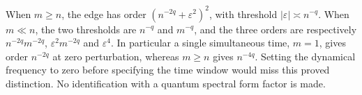 When $m\ge n$, the edge has order $(n^{-2q}+\varepsilon^2)^2$, with
threshold $|\varepsilon|\asymp n^{-q}$. When $m\ll n$, the two thresholds
are $n^{-q}$ and $m^{-q}$, and the three orders are respectively
$n^{-2q}m^{-2q}$, $\varepsilon^2m^{-2q}$ and $\varepsilon^4$.
In particular a single simultaneous time, $m=1$, gives order $n^{-2q}$ at
zero perturbation, whereas $m\ge n$ gives $n^{-4q}$. Setting the dynamical
frequency to zero before specifying the time window would miss this
proved distinction. No identification with a quantum spectral form factor
is made.
